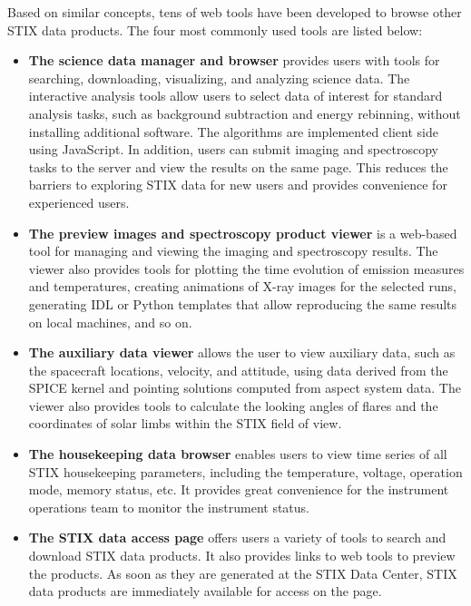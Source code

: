 \documentclass[referee]{aa} %
\begin{document}
Based on similar concepts, tens of web tools have been developed to browse other STIX data products. The four most commonly used tools are listed below: 
\begin{itemize}
  \item  {\bf The science data manager and browser} provides users with tools for searching, downloading, visualizing, and analyzing science data. The interactive analysis tools allow users to select data of interest for standard analysis tasks, such as background subtraction and energy rebinning,  without installing additional software. 
  The algorithms are implemented client side using JavaScript. In addition, users can submit imaging and spectroscopy tasks to the server and view the results on the same page. This reduces the barriers to exploring STIX data for new users and provides convenience for experienced users.

  \item  {\bf The preview images and spectroscopy product viewer} is a web-based tool for managing and viewing the imaging and spectroscopy results. The viewer also provides tools for plotting the time evolution of emission measures and temperatures,  creating animations of X-ray images for the selected runs, generating IDL or Python templates that allow reproducing the same results on local machines, and so on. 
  \item {\bf The auxiliary data viewer} allows the user to view auxiliary data, such as the spacecraft locations, velocity, and attitude, using data derived from the SPICE kernel and  pointing solutions computed from aspect system data.
  The viewer also provides tools to calculate the looking angles of flares and the coordinates of solar limbs within the STIX field of view.
  \item  {\bf The housekeeping data browser} enables users to view time series of all STIX housekeeping parameters, including the temperature, voltage, operation mode, memory status, etc. It provides great convenience for the instrument operations team to monitor the instrument status. 
\item {\bf The STIX data access page} offers users a variety of tools to search and download STIX data products. 
It also provides links to web tools to preview the products. As soon as they are generated at the STIX Data Center, STIX data products are immediately available for access on the page.
\end{itemize}
\end{document}
